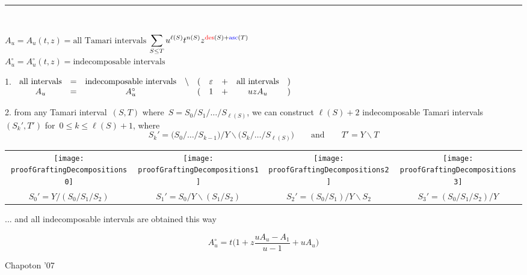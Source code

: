 \documentclass[12pt,titlepage,landscape,a4paper]{article}
\newcommand{\textemoyen}{\fontsize{23}{27}\selectfont}
\newenvironment{slide}[1]
{
\newpage
\begin{center}
{\blue \textemoyen \smash{\uppercase{#1}}}\\
\end{center}
\vspace{-1cm}
\rule{\textwidth}{0.5 pt}\\
\vspace{-.8cm}
}
{\vspace*{-3cm}}
\newcommand{\violet}{\color{violet}} %
\newcommand{\blue}{\color{blue}} %
\newcommand{\red}{\color{red}} %
\newcommand{\papier}[1]{{\violet\fontsize{15}{20}\selectfont #1}} %
\DeclareMathOperator{\des}{{\red des}} %
\DeclareMathOperator{\asc}{{\blue asc}} %
\begin{document}

\begin{slide}{Quadratic equation}

$A_u = A_u(t,z) = \text{all Tamari intervals}$ \hfill $\displaystyle \sum_{S \le T} u^{\ell(S)} t^{n(S)} z^{\des(S) + \asc(T)}
$ \\[-.7cm]
$A^\circ_u = A^\circ_u(t,z) = \text{indecomposable intervals}$

\vspace{.8cm}
1. 
$
\begin{array}[t]{ccccccccc}
\text{all intervals} & = & \text{indecomposable intervals} & \backslash & (&\varepsilon & + & \text{all intervals} &) \\ 
A_u & = & A^\circ_u && (&1 & + & u z A_u&)
\end{array}
$

\vspace{.8cm}
2. from any Tamari interval~$(S,T)$ where~$S = S_0 / S_1 / \dots / S_{\ell(S)}$, we can construct $\ell(S)+2$ indecomposable Tamari intervals~$(S_k',T')$ for~$0 \le k \le \ell(S)+1$, where
\[
S_k' = \big( S_0 / \dots / S_{k-1} \big) / Y \backslash \big( S_k / \dots / S_{\ell(S)} \big)
\qquad\text{and}\qquad
T' = Y \backslash T
\]

\begin{tabular}{c@{\quad}c@{\quad}c@{\quad}c}
	\texttt{[image: proofGraftingDecompositions0]} &
	\texttt{[image: proofGraftingDecompositions1]} &
	\texttt{[image: proofGraftingDecompositions2]} &
	\texttt{[image: proofGraftingDecompositions3]} \\
	$S_0' = Y / (S_0 / S_1 / S_2)$ &
	$S_1' = S_0 / Y \backslash (S_1 / S_2)$ &
	$S_2' = (S_0 / S_1) / Y \backslash S_2$ &
	$S_3' = (S_0 / S_1 / S_2) / Y$
\end{tabular}

\vspace{.5cm}
... and all indecomposable intervals are obtained this way

\[
A^\circ_u = t \Big( 1 + z \frac{u A_u - A_1}{u-1} + u A_u \Big)
\]

\vspace*{-3cm}

\vfill
\hfill \papier{Chapoton '07}
\vspace*{2.5cm}

\end{slide}

\end{document}
